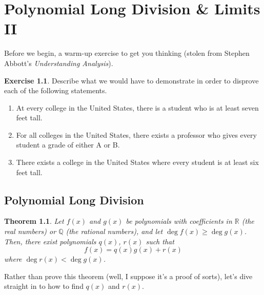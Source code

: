 \documentclass[english]{book}
\newcommand{\RR}{\mathbb{R}}
\newcommand{\QQ}{\mathbb{Q}}
\newtheorem{theorem}{Theorem}[section]
\theoremstyle{remark}
\theoremstyle{definition}
\newtheorem{excs}{Exercise}[chapter]
\newtheorem*{next week}{Next Week}
\begin{document}
\chapter{Polynomial Long Division \& Limits II}
\setcounter{section}{-1}
Before we begin, a warm-up exercise to get you thinking (stolen from Stephen Abbott's \emph{Understanding Analysis}).
\begin{excs}
Describe what we would have to demonstrate in order to disprove each of the following statements.\begin{enumerate}

\item At every college in the United States, there is a student who is at least seven feet tall.
\item For all colleges in the United States, there exists a professor who gives every student a grade of either A or B.
\item There exists a college in the United States where every student is at least
six feet tall.\end{enumerate}
\end{excs}
\section{Polynomial Long Division}
\begin{theorem}
	Let $f(x)$ and $g(x)$ be polynomials with coefficients in $\RR$ (the real numbers) or $\QQ$ (the rational numbers), and let $\deg f(x)\geq \deg g(x)$. Then, there exist polynomials  $q(x)$, $r(x)$ such that $$f(x)=q(x)g(x)+r(x)$$ where $\deg r(x)<\deg g(x)$. 
 \end{theorem}
Rather than prove this theorem (well, I suppose it's a proof of sorts), let's dive straight in to how to find $q(x)$ and $r(x)$.
\end{document}
